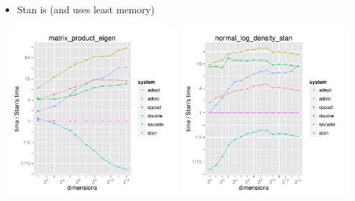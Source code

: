 \documentclass[10pt]{report}
\begin{document}
%
\vspace*{-4pt}
\begin{itemize}
\item Stan is  (and uses least memory)
\end{itemize}
\vspace*{-8pt}
\mbox{ } \hfill \hfill
\includegraphics[width=0.48\textwidth]{img/autodiff-eval-matrix-product-eigen.pdf}
\hfill
\includegraphics[width=0.48\textwidth]{img/autodiff-eval-normal-density.pdf}
\hfill \hfill
\end{document}
